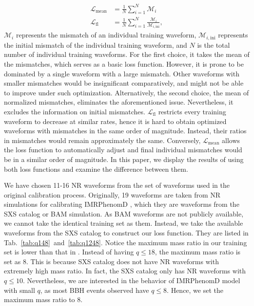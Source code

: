 \documentclass[twocolumn]{aastex631}
\begin{document}
\begin{align}
	\mathcal{L}_{\mathrm{mean}}&=\frac{1}{N}\sum_{i=1}^N\mathcal{M}_i \\
	\mathcal{L}_{\mathrm{fl}}&=\frac{1}{N}\sum_{i=1}^N\frac{\mathcal{M}_i}{\mathcal{M}_{i,\mathrm{ini}}},
\end{align}	
$\mathcal{M}_i$ represents the mismatch of an individual training waveform, $\mathcal{M}_{i,\mathrm{ini}}$ represents the initial mismatch of the individual training waveform, and $N$ is the total number of individual training waveforms. For the first choice, it takes the mean of the mismatches, which serves as a basic loss function. However, it is prone to be dominated by a single waveform with a large mismatch. Other waveforms with smaller mismatches would be insignificant comparatively, and might not be able to improve under such optimization. Alternatively, the second choice, the mean of normalized mismatches, eliminates the aforementioned issue. Nevertheless, it excludes the information on initial mismatches. $\mathcal{L}_{\mathrm{fl}}$ restricts every training waveform to decrease at similar rates, hence it is hard to obtain optimized waveforms with mismatches in the same order of magnitude. Instead, their ratios in mismatches would remain approximately the same. Conversely, $\mathcal{L}_{\mathrm{mean}}$ allows the loss function to automatically adjust and final individual mismatches would be in a similar order of magnitude. In this paper, we display the results of using both loss functions and examine the difference between them. 

We have chosen 11-16 NR waveforms from the set of waveforms used in the original calibration process. Originally, 19 waveforms are taken from NR simulations for calibrating IMRPhenomD \cite{khan2016frequency,husa2016frequency}, which they are waveforms from the SXS catalog or BAM simulation. As BAM waveforms are not publicly available, we cannot take the identical training set as them. Instead, we take the available waveforms from the SXS catalog to construct our loss function. They are listed in Tab.~\ref{tab:q148}~and~\ref{tab:q1248}. Notice the maximum mass ratio in our training set is lower than that in \cite{khan2016frequency}. Instead of having $q\leq18$, the maximum mass ratio is set as 8. This is because SXS catalog does not have NR waveforms with extremely high mass ratio. In fact, the SXS catalog only has NR waveforms with $q\leq10$. Nevertheless, we are interested in the behavior of IMRPhenomD model with small $q$, as most BBH events observed have $q\leq8$. Hence, we set the maximum mass ratio to 8. 
\end{document}
